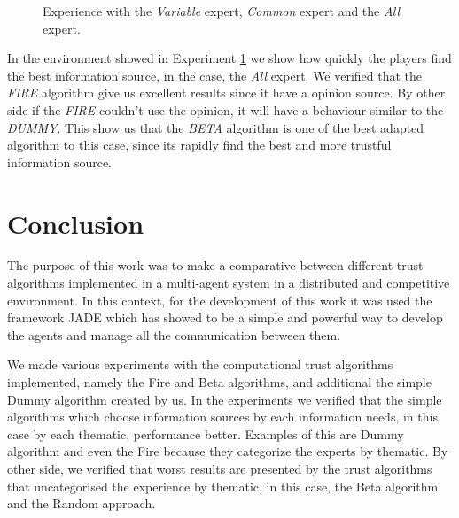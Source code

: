\documentclass{llncs}
\begin{document}
\begin{figure}
\centering
{}
\caption{Experience with the \textit{Variable} expert, \textit{Common} expert and the \textit{All} expert.}
\label{varyAllCommon}
\end{figure}

In the environment showed in Experiment \ref{varyAllCommon} we show how quickly the players find the best information source, in the case, the \textit{All} expert. We verified that the \textit{FIRE} algorithm give us excellent results since it have a opinion source. By other side if the \textit{FIRE} couldn't use the opinion, it will have a behaviour similar to the \textit{DUMMY}. This show us that the \textit{BETA} algorithm is one of the best adapted algorithm to this case, since its rapidly find the best and more trustful information source.

\section{Conclusion}\label{sec:Conclusion}

The purpose of this work was to make a comparative between different trust algorithms implemented in a multi-agent system in a distributed and competitive environment. In this context, for the development of this work it was used the framework JADE which has showed to be a simple and powerful way to develop the agents and manage all the communication between them.

We made various experiments with the computational trust algorithms implemented, namely the Fire and Beta algorithms, and additional the simple Dummy algorithm created by us. In the experiments we verified that the simple algorithms which choose information sources by each information needs, in this case by each thematic, performance better. Examples of this are Dummy algorithm and even the Fire because they categorize the experts by thematic. By other side, we verified that worst results are presented by the trust algorithms that uncategorised the experience by thematic, in this case, the Beta algorithm and the Random approach.
\end{document}
